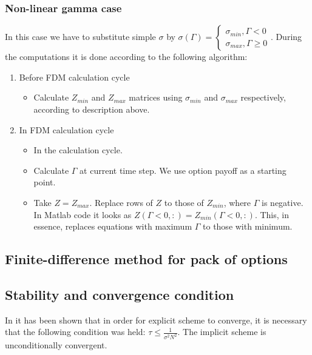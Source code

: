 \documentclass[11pt]{article} %
\begin{document}
\subsubsection{Non-linear gamma case}
In this case we have to substitute simple $\sigma$ by $\sigma(\Gamma) = \begin{cases}\sigma_{min}, \Gamma < 0\\\sigma_{max}, \Gamma \geq 0\end{cases}$. During the computations it is done according to the following algorithm:
\begin{enumerate}
	\item Before FDM calculation cycle
	\begin{itemize}
		\item Calculate $Z_{min}$ and $Z_{max}$ matrices using $\sigma_{min}$ and $\sigma_{max}$ respectively, according to description above.
	\end{itemize}
	\item In FDM calculation cycle
	\begin{itemize}
		\item In the calculation cycle.
		\item Calculate $\Gamma$ at current time step. We use option payoff as a starting point.
		\item Take $Z = Z_{max}$. Replace rows of $Z$ to those of $Z_{min}$, where $\Gamma$ is negative. In Matlab code it looks as $Z(\Gamma < 0, :) = Z_{min}(\Gamma<0,:)$. This, in essence, replaces equations with maximum $\Gamma$ to those with minimum.
	\end{itemize}
\end{enumerate}


\subsection{Finite-difference method for pack of options}

\subsection{Stability and convergence condition}
In \cite[ch. ????]{PWoQF06} it has been shown that in order for explicit scheme to converge, it is necessary that the following condition was held: $\tau \leq \frac{1}{\sigma^2 N^2}$. The implicit scheme is unconditionally convergent. 
\end{document}

